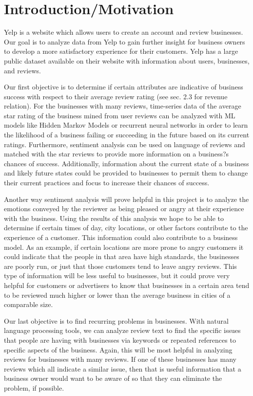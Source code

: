 
\section{Introduction/Motivation}

\quad Yelp is a website which allows users to create an account and review businesses. Our goal is to analyze data from Yelp to gain further insight for business owners to develop a more satisfactory experience for their customers. Yelp has a large public dataset available on their website with information about users, businesses, and reviews.

\quad Our first objective is to determine if certain attributes are indicative of business success with respect to their average review rating (see sec. 2.3 for revenue relation). For the businesses with many reviews, time-series data of the average star rating of the business mined from user reviews can be analyzed with ML models like Hidden Markov Models or recurrent neural networks in order to learn the likelihood of a business failing or succeeding in the future based on its current ratings. Furthermore, sentiment analysis can be used on language of reviews and matched with the star reviews to provide more information on a business?s chances of success. Additionally, information about the current state of a business and likely future states could be provided to businesses to permit them to change their current practices and focus to increase their chances of success.

\quad Another way sentiment analysis will prove helpful in this project is to analyze the emotions conveyed by the reviewer as being pleased or angry at their experience with the business. Using the results of this analysis we hope to be able to determine if certain times of day, city locations, or other factors contribute to the experience of a customer. This information could also contribute to a business model. As an example, if certain locations are more prone to angry customers it could indicate that the people in that area have high standards, the businesses are poorly run, or just that those customers tend to leave angry reviews. This type of information will be less useful to businesses, but it could prove very helpful for customers or advertisers to know that businesses in a certain area tend to be reviewed much higher or lower than the average business in cities of a comparable size.

\quad Our last objective is to find recurring problems in businesses. With natural language processing tools, we can analyze review text to find the specific issues that people are having with businesses via keywords or repeated references to specific aspects of the business. Again, this will be most helpful in analyzing reviews for businesses with many reviews. If one of these businesses has many reviews which all indicate a similar issue, then that is useful information that a business owner would want to be aware of so that they can eliminate the problem, if possible.

